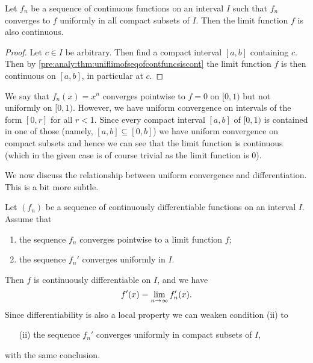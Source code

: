 \documentclass[10pt, a4paper]{article}
\begin{document}
\begin{theorem}
    Let $f_n$ be a sequence of continuous functions on an interval $I$ such that $f_n$ converges to $f$ uniformly in all compact subsets of $I$.
    Then the limit function $f$ is also continuous.

    \begin{proof}
        Let $c \in I$ be arbitrary.
        Then find a compact interval $[a, b]$ containing $c$.
        Then by \autoref{pre:analy:thm:uniflimofseqofcontfuncsiscont} the limit function $f$ is then continuous on $[a, b]$,
        in particular at $c$.
    \end{proof}
\end{theorem}

\begin{example}
    We say that $f_n(x) = x ^ n$ converges pointwise to $f = 0$ on $[0, 1)$ but not uniformly on $[0, 1)$.
    However,
    we have uniform convergence on intervals of the form $[0, r]$ for all $r < 1$.
    Since every compact interval $[a, b]$ of $[0, 1)$ is contained in one of those
    (namely,
    $[a, b] \subseteq [0, b]$)
    we have uniform convergence on compact subsets and hence we can see that the limit function is continuous
    (which in the given case is of course trivial as the limit function is $0$).
\end{example}

We now discuss the relationship between uniform convergence and differentiation.
This is a bit more subtle.

\begin{theorem}\label{pre:analy:thm:contdifffuncsconvas}
    Let $(f_n)$ be a sequence of continuously differentiable functions on an interval $I$.
    Assume that
    \begin{enumerate}[label = (\roman*)]
        \item the sequence $f_n$ converges pointwise to a limit function $f$;
        \item the sequence $f_n'$ converges uniformly in $I$.
    \end{enumerate}
    Then $f$ is continuously differentiable on $I$,
    and we have
    \[
    f'(x) = \lim_{n \rightarrow \infty} f_n'(x).
    \]
    Since differentiability is also a local property we can weaken condition (ii) to
    \begin{enumerate}[label = (\roman*)]
        \item[(ii)] the sequence $f_n'$ converges uniformly in compact subsets of $I$,
    \end{enumerate}
    with the same conclusion.
\end{theorem}
\end{document}
